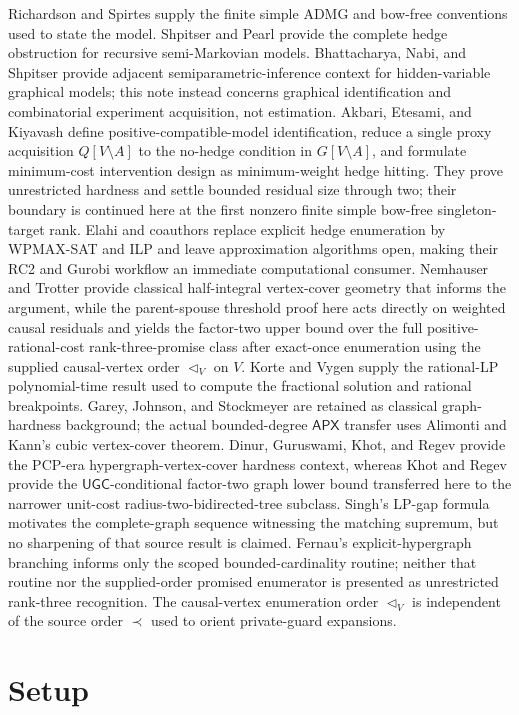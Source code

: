 \documentclass{article}
\begin{document}
Richardson and Spirtes supply the finite simple ADMG and bow-free conventions used to state the model. Shpitser and Pearl provide the complete hedge obstruction for recursive semi-Markovian models. Bhattacharya, Nabi, and Shpitser provide adjacent semiparametric-inference context for hidden-variable graphical models; this note instead concerns graphical identification and combinatorial experiment acquisition, not estimation. Akbari, Etesami, and Kiyavash define positive-compatible-model identification, reduce a single proxy acquisition \(Q[V\setminus A]\) to the no-hedge condition in \(G[V\setminus A]\), and formulate minimum-cost intervention design as minimum-weight hedge hitting. They prove unrestricted hardness and settle bounded residual size through two; their boundary is continued here at the first nonzero finite simple bow-free singleton-target rank. Elahi and coauthors replace explicit hedge enumeration by WPMAX-SAT and ILP and leave approximation algorithms open, making their RC2 and Gurobi workflow an immediate computational consumer. Nemhauser and Trotter provide classical half-integral vertex-cover geometry that informs the argument, while the parent-spouse threshold proof here acts directly on weighted causal residuals and yields the factor-two upper bound over the full positive-rational-cost rank-three-promise class after exact-once enumeration using the supplied causal-vertex order \(\triangleleft_V\) on \(V\). Korte and Vygen supply the rational-LP polynomial-time result used to compute the fractional solution and rational breakpoints. Garey, Johnson, and Stockmeyer are retained as classical graph-hardness background; the actual bounded-degree \(\mathsf{APX}\) transfer uses Alimonti and Kann's cubic vertex-cover theorem. Dinur, Guruswami, Khot, and Regev provide the PCP-era hypergraph-vertex-cover hardness context, whereas Khot and Regev provide the \(\mathsf{UGC}\)-conditional factor-two graph lower bound transferred here to the narrower unit-cost radius-two-bidirected-tree subclass. Singh's LP-gap formula motivates the complete-graph sequence witnessing the matching supremum, but no sharpening of that source result is claimed. Fernau's explicit-hypergraph branching informs only the scoped bounded-cardinality routine; neither that routine nor the supplied-order promised enumerator is presented as unrestricted rank-three recognition. The causal-vertex enumeration order \(\triangleleft_V\) is independent of the source order \(\prec\) used to orient private-guard expansions.

\section{Setup}
\end{document}
